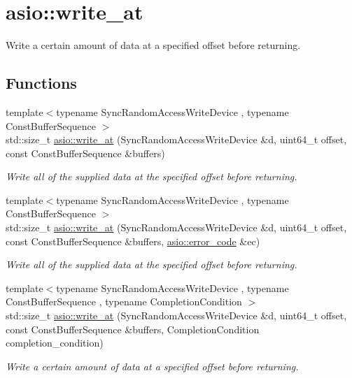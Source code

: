 \hypertarget{group__write__at}{}\section{asio\+:\+:write\+\_\+at}
\label{group__write__at}


Write a certain amount of data at a specified offset before returning.  


\subsection*{Functions}
\begin{DoxyCompactItemize}
\item 
{\footnotesize template$<$typename Sync\+Random\+Access\+Write\+Device , typename Const\+Buffer\+Sequence $>$ }\\std\+::size\+\_\+t \hyperlink{group__write__at_gadd67a05a29d183782491d14aceec7d41}{asio\+::write\+\_\+at} (Sync\+Random\+Access\+Write\+Device \&d, uint64\+\_\+t offset, const Const\+Buffer\+Sequence \&buffers)
\begin{DoxyCompactList}\small\item\em Write all of the supplied data at the specified offset before returning. \end{DoxyCompactList}\item 
{\footnotesize template$<$typename Sync\+Random\+Access\+Write\+Device , typename Const\+Buffer\+Sequence $>$ }\\std\+::size\+\_\+t \hyperlink{group__write__at_ga8c1abcb5870505ea2a0c524a59638da0}{asio\+::write\+\_\+at} (Sync\+Random\+Access\+Write\+Device \&d, uint64\+\_\+t offset, const Const\+Buffer\+Sequence \&buffers, \hyperlink{classasio_1_1error__code}{asio\+::error\+\_\+code} \&ec)
\begin{DoxyCompactList}\small\item\em Write all of the supplied data at the specified offset before returning. \end{DoxyCompactList}\item 
{\footnotesize template$<$typename Sync\+Random\+Access\+Write\+Device , typename Const\+Buffer\+Sequence , typename Completion\+Condition $>$ }\\std\+::size\+\_\+t \hyperlink{group__write__at_ga3e6b2f5dd13f4273695fbf0cdec0314a}{asio\+::write\+\_\+at} (Sync\+Random\+Access\+Write\+Device \&d, uint64\+\_\+t offset, const Const\+Buffer\+Sequence \&buffers, Completion\+Condition completion\+\_\+condition)
\begin{DoxyCompactList}\small\item\em Write a certain amount of data at a specified offset before returning. \end{DoxyCompactList}\item 

\end{DoxyCompactItemize}
